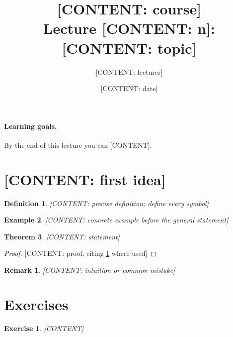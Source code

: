 \documentclass[11pt,a4paper]{scrartcl}
\title{[CONTENT: course] \\ \large Lecture [CONTENT: n]: [CONTENT: topic]}
\author{[CONTENT: lecturer]}
\date{[CONTENT: date]}
\theoremstyle{thm}
\newtheorem{theorem}{Theorem}[section]
\theoremstyle{defn}
\newtheorem{definition}[theorem]{Definition}
\newtheorem{example}[theorem]{Example}
\newtheorem*{remark}{Remark}
\newtheorem{exercise}{Exercise}[section]
\begin{document}
\maketitle

\paragraph{Learning goals.} By the end of this lecture you can [CONTENT].

\section{[CONTENT: first idea]}

\begin{definition}\label{def:main}
{}[CONTENT: precise definition; define every symbol]
\end{definition}

\begin{example}
{}[CONTENT: concrete example before the general statement]
\end{example}

\begin{theorem}\label{thm:main}
{}[CONTENT: statement]
\end{theorem}

\begin{proof}
{}[CONTENT: proof, citing \cref{def:main} where used]
\end{proof}

\begin{remark}
{}[CONTENT: intuition or common mistake]
\end{remark}

\section{Exercises}

\begin{exercise}
{}[CONTENT]
\end{exercise}
\end{document}
